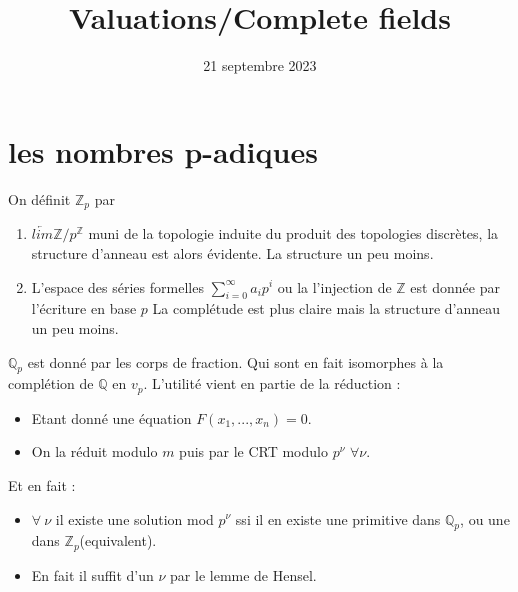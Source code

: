 \documentclass[12pt]{article}
\title{Valuations/Complete fields}
\date{21 septembre 2023}
\theoremstyle{plain}
\newcommand{\Z}{\mathbb{Z}}
\newcommand{\Q}{\mathbb{Q}}
\begin{document}
\maketitle
\tableofcontents

\section{les nombres p-adiques}
On définit $\Z_p$ par
\begin{enumerate}
    \item $\underleftarrow{lim} \Z/p^\Z$ muni de la topologie induite du produit des topologies discrètes, la structure d'anneau est alors évidente.
La structure un peu moins.
    \item L'espace des séries formelles $\sum_{i=0}^{\infty} a_ip^i$ ou la l'injection de $\Z$ est donnée par l'écriture en base $p$
La complétude est plus claire mais la structure d'anneau un peu moins.
\end{enumerate}
$\Q_p$ est donné par les corps de fraction. Qui sont en fait isomorphes à la complétion de $\Q$ en $v_p$.
L'utilité vient en partie de la réduction :
\begin{itemize}
    \item Etant donné une équation $F(x_1,...,x_n)=0$.
    \item On la réduit modulo $m$ puis par le CRT modulo $p^{\nu}$ $\forall \nu$.
\end{itemize}

Et en fait :
\begin{itemize}
    \item $\forall~\nu$ il existe une solution mod $p^{\nu}$ ssi il en existe une primitive dans $\Q_p$, ou une dans $\Z_p$(equivalent).
    \item En fait il suffit d'un $\nu$ par le lemme de Hensel.
\end{itemize}
\end{document}
